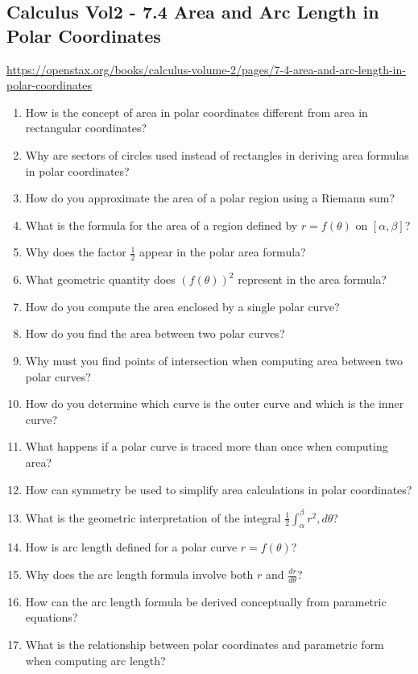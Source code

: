 \subsection{Calculus Vol2 - 7.4 Area and Arc Length in Polar Coordinates}

\url{https://openstax.org/books/calculus-volume-2/pages/7-4-area-and-arc-length-in-polar-coordinates}

\begin{enumerate}
  \item How is the concept of area in polar coordinates different from area in rectangular coordinates?
  \item Why are sectors of circles used instead of rectangles in deriving area formulas in polar coordinates?
  \item How do you approximate the area of a polar region using a Riemann sum?
  \item What is the formula for the area of a region defined by $r = f(\theta)$ on $[\alpha, \beta]$?
  \item Why does the factor $\frac{1}{2}$ appear in the polar area formula?
  \item What geometric quantity does $(f(\theta))^2$ represent in the area formula?
  \item How do you compute the area enclosed by a single polar curve?
  \item How do you find the area between two polar curves?
  \item Why must you find points of intersection when computing area between two polar curves?
  \item How do you determine which curve is the outer curve and which is the inner curve?
  \item What happens if a polar curve is traced more than once when computing area?
  \item How can symmetry be used to simplify area calculations in polar coordinates?
  \item What is the geometric interpretation of the integral $\frac{1}{2}\int_\alpha^\beta r^2,d\theta$?
  \item How is arc length defined for a polar curve $r = f(\theta)$?
  \item Why does the arc length formula involve both $r$ and $\frac{dr}{d\theta}$?
  \item How can the arc length formula be derived conceptually from parametric equations?
  \item What is the relationship between polar coordinates and parametric form when computing arc length?

\end{enumerate}
